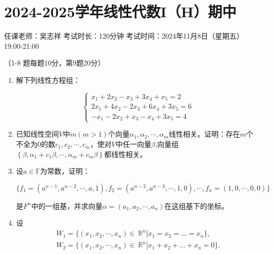 \section*{2024-2025学年线性代数I（H）期中}

\begin{center}
    任课老师：吴志祥\hspace{4em} 考试时长：120分钟
    考试时间：2024年11月8日（星期五）19:00-21:00
\end{center}

（1-8 题每题10分，第9题20分）

\begin{enumerate}
    \item 解下列线性方程组：

          \[
              \begin{cases}
                  x_1 + 2x_2 - x_3 + 3x_4 +x_5 = 2     \\
                  2x_1 + 4x_2 - 2x_3 + 6x_4 + 3x_5 = 6 \\
                  -x_1 - 2x_2 + x_3 - x_4 + 3x_5 = 4
              \end{cases}
          \]

    \item 已知线性空间\(V\)中\(m(m > 1)\)个向量\(\alpha_1,\alpha_2,\cdots,\alpha_{m}\)线性相关。证明：存在\(m\)个不全为\(0\)的数\(c_1,c_2,\cdots,c_{m}\)，使对\(V\)中任一向量\(\beta\),向量组\(\left\{ \beta,\alpha_1 + c_1\beta,\cdots,\alpha_{m} + c_{m}\beta \right\}\)都线性相关。

    \item 设\(a \in \mathbb{F}\)为常数，证明：

          \[\{ f_1 = \left( a^{n - 1},a^{n - 2},\cdots,a,1 \right),f_2 = \left( a^{n - 2},a^{n - 3},\cdots,1,0 \right),\cdots,f_{n} = (1,0,\cdots,0,0)\}\]

          是\(F^{n}\)中的一组基，并求向量\(\alpha = \left( a_1,a_2,\cdots,a_{n} \right)\)在这组基下的坐标。

    \item 设
          \begin{align*}
              W_1 = \{ \left( x_1,x_2,\cdots,x_{n} \right) \in \left. \ \mathbb{R}^{n} \right|x_1 = x_2 = \ldots = x_{n} \}, \\
              W_2 = \{ \left( x_1,x_2,\cdots,x_{n} \right) \in \left. \ \mathbb{R}^{n} \right|x_1 + x_2 + \ldots + x_{n} = 0 \}.
          \end{align*}


\end{enumerate}
